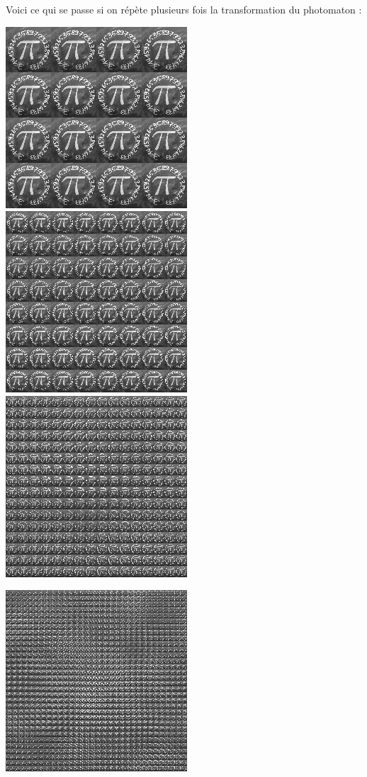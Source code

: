 \documentclass[11pt,class=report,crop=false]{standalone}
\begin{document}
\begin{cours}
Voici ce qui se passe si on répète plusieurs fois la transformation du photomaton :
\begin{center}
\includegraphics[scale=0.3]{images_fiche/pi_gimp_new_photo_2.png}\qquad
\includegraphics[scale=0.3]{images_fiche/pi_gimp_new_photo_3.png}\qquad
\includegraphics[scale=0.3]{images_fiche/pi_gimp_new_photo_4.png}
\end{center}
\begin{center}
\includegraphics[scale=0.3]{images_fiche/pi_gimp_new_photo_5.png}\qquad

\end{center}
\end{cours}
\end{document}
